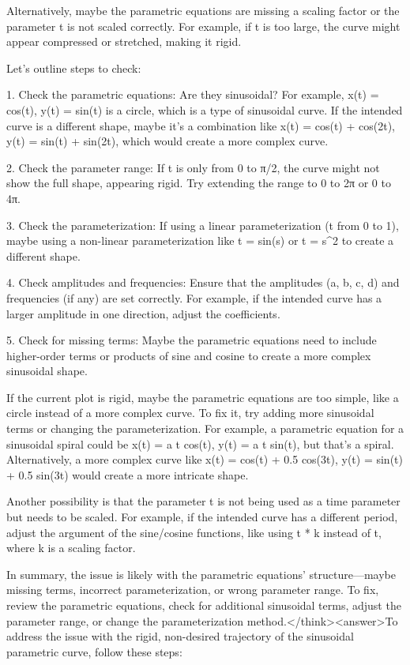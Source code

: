 Alternatively, maybe the parametric equations are missing a scaling factor or the parameter t is not scaled correctly. For example, if t is too large, the curve might appear compressed or stretched, making it rigid.

Let's outline steps to check:

1. Check the parametric equations: Are they sinusoidal? For example, x(t) = cos(t), y(t) = sin(t) is a circle, which is a type of sinusoidal curve. If the intended curve is a different shape, maybe it's a combination like x(t) = cos(t) + cos(2t), y(t) = sin(t) + sin(2t), which would create a more complex curve.

2. Check the parameter range: If t is only from 0 to π/2, the curve might not show the full shape, appearing rigid. Try extending the range to 0 to 2π or 0 to 4π.

3. Check the parameterization: If using a linear parameterization (t from 0 to 1), maybe using a non-linear parameterization like t = sin(s) or t = s^2 to create a different shape.

4. Check amplitudes and frequencies: Ensure that the amplitudes (a, b, c, d) and frequencies (if any) are set correctly. For example, if the intended curve has a larger amplitude in one direction, adjust the coefficients.

5. Check for missing terms: Maybe the parametric equations need to include higher-order terms or products of sine and cosine to create a more complex sinusoidal shape.

If the current plot is rigid, maybe the parametric equations are too simple, like a circle instead of a more complex curve. To fix it, try adding more sinusoidal terms or changing the parameterization. For example, a parametric equation for a sinusoidal spiral could be x(t) = a t cos(t), y(t) = a t sin(t), but that's a spiral. Alternatively, a more complex curve like x(t) = cos(t) + 0.5 cos(3t), y(t) = sin(t) + 0.5 sin(3t) would create a more intricate shape.

Another possibility is that the parameter t is not being used as a time parameter but needs to be scaled. For example, if the intended curve has a different period, adjust the argument of the sine/cosine functions, like using t * k instead of t, where k is a scaling factor.

In summary, the issue is likely with the parametric equations' structure—maybe missing terms, incorrect parameterization, or wrong parameter range. To fix, review the parametric equations, check for additional sinusoidal terms, adjust the parameter range, or change the parameterization method.</think><answer>To address the issue with the rigid, non-desired trajectory of the sinusoidal parametric curve, follow these steps:  

